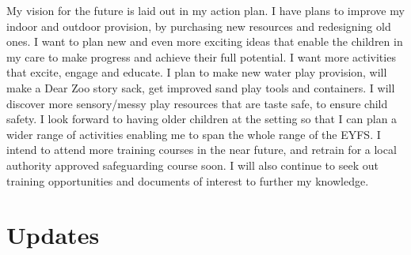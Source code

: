 \documentclass[10pt,a4paper]{report}
\begin{document}
My vision for the future is laid out in my action plan. I have plans to improve my indoor and outdoor provision, by purchasing new resources and redesigning old ones. I want to plan new and even more exciting ideas that enable the children in my care to make progress and achieve their full potential. I want more activities that excite, engage and educate. I plan to make new water play provision, will make a Dear Zoo story sack, get improved sand play tools and containers. I will discover more sensory/messy play resources that are taste safe, to ensure child safety. I look forward to having older children at the setting so that I can plan a wider range of activities enabling me to span the whole range of the EYFS. I intend to attend more training courses in the near future, and retrain for a local authority approved safeguarding course soon. I will also continue to seek out training opportunities and documents of interest to further my knowledge.

\section{Updates}
\end{document}
